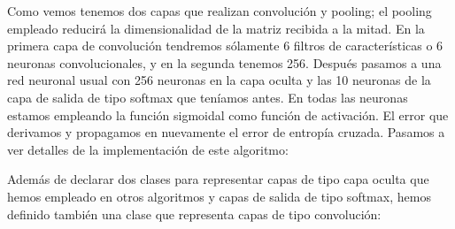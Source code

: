 \documentclass[10pt,a4paper]{article}
\begin{document}
\begin{center}
\end{center}

Como vemos tenemos dos capas que realizan convolución y pooling; el pooling empleado reducirá la dimensionalidad de la matriz recibida a la mitad. En la primera capa de convolución tendremos sólamente 6 filtros de características o 6 neuronas convolucionales, y en la segunda tenemos 256. Después pasamos a una red neuronal usual con 256 neuronas en la capa oculta y las 10 neuronas de la capa de salida de tipo softmax que teníamos antes. En todas las neuronas estamos empleando la función sigmoidal como función de activación. El error que derivamos y propagamos en nuevamente el error de entropía cruzada. Pasamos a ver detalles de la implementación de este algoritmo:

Además de declarar dos clases para representar capas de tipo capa oculta que hemos empleado en otros algoritmos y capas de salida de tipo softmax, hemos definido también una clase que representa capas de tipo convolución:
\end{document}
